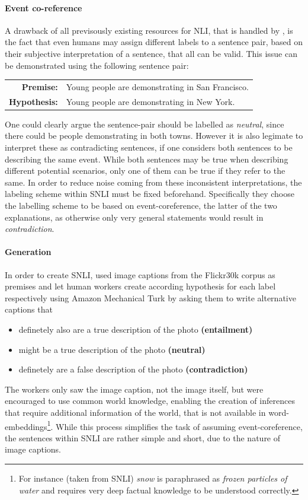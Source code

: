 \paragraph*{Event co-reference}
A drawback of all previsously existing resources for \ac{NLI}, that is handled by \cite{bowman2015large}, is the fact that even humans may assign different labels to a sentence pair, based on their subjective interpretation of a sentence, that all can be valid. This issue can be demonstrated using the following sentence pair:
\begin{center}
\begin{tabular}{rl}
\textbf{Premise:} & Young people are demonstrating in San Francisco.
\\
\textbf{Hypothesis:} & Young people are demonstrating in New York.
\end{tabular}
\end{center}
One could clearly argue the sentence-pair should be labelled as \textit{neutral}, since there could be people demonstrating in both towns. However it is also legimate to interpret these as contradicting sentences, if one considers both sentences to be describing the same event. While both sentences may be true when describing different potential scenarios, only one of them can be true if they refer to the same. In order to reduce noise coming from these inconsistent interpretations, the labeling scheme within \ac{SNLI} must be fixed beforehand. Specifically they choose the labelling scheme to be based on event-coreference, the latter of the two explanations, as otherwise only very general statements would result in \textit{contradiction}.
\paragraph*{Generation}
In order to create \ac{SNLI}, \cite{bowman2015large} used image captions from the Flickr30k corpus \citep{young2014image} as premises and let human workers create according hypothesis for each label respectively using Amazon Mechanical Turk by asking them to write alternative captions that
\begin{itemize}
\item definetely also are a true description of the photo  \textbf{(entailment)}
\item might be a true description of the photo \textbf{(neutral)}
\item definetely are a false description of the photo \textbf{(contradiction)}
\end{itemize}
The workers only saw the image caption, not the image itself, but were encouraged to use common world knowledge, enabling the creation of inferences that require additional information of the world, that is not available in word-embeddings\footnote{For instance (taken from \ac{SNLI}) \textit{snow} is paraphrased as \textit{frozen particles of water} and requires very deep factual knowledge to be understood correctly.}. While this process simplifies the task of assuming event-coreference, the sentences within \ac{SNLI} are rather simple and short, due to the nature of image captions. 

